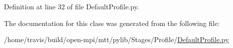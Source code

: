 Definition at line 32 of file Default\-Profile.\-py.



The documentation for this class was generated from the following file\-:\begin{DoxyCompactItemize}
\item 
/home/travis/build/open-\/mpi/mtt/pylib/\-Stages/\-Profile/\hyperlink{_default_profile_8py}{Default\-Profile.\-py}\end{DoxyCompactItemize}
